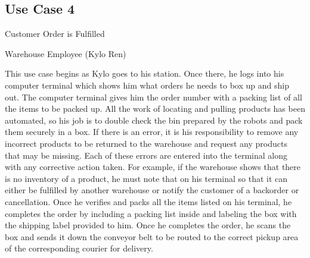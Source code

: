 \documentclass{article}
\begin{document}
\subsection{Use Case 4}
\begin{description}[font=\bfseries\itshape]
\item[Title:]Customer Order is Fulfilled
\item[Actors:]Warehouse Employee (Kylo Ren)
\item[Description:]This use case begins as Kylo goes to his station.  Once there, he logs into his computer terminal which shows him what orders he needs to box up and ship out. The computer terminal gives him the order number with a packing list of all the items to be packed up.  All the work of locating and pulling products has been automated, so his job is to double check the bin prepared by the robots and pack them securely in a box.  If there is an error, it is his responsibility to remove any incorrect products to be returned to the warehouse and request any products that may be missing.  Each of these errors are entered into the terminal along with any corrective action taken.  For example, if the warehouse shows that there is no inventory of a product, he must note that on his terminal so that it can either be fulfilled by another warehouse or notify the customer of a backorder or cancellation.  Once he verifies and packs all the items listed on his terminal, he completes the order by including a packing list inside and labeling the box with the shipping label provided to him.  Once he completes the order, he scans the box and sends it down the conveyor belt to be routed to the correct pickup area of the corresponding courier for delivery.
\end{description}
\end{document}

